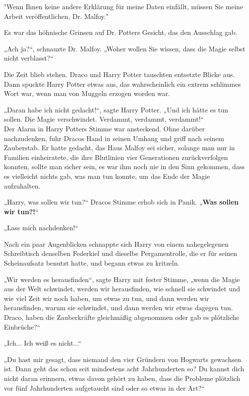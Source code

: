 {"Wenn Ihnen keine andere Erklärung für meine Daten einfällt, müssen Sie meine Arbeit veröffentlichen, Dr. Malfoy."

Es war das höhnische Grinsen auf Dr. Potters Gesicht, das den Ausschlag gab.

„Ach ja?“, schnauzte Dr. Malfoy. „Woher wollen Sie wissen, dass die Magie selbst nicht verblasst?“

Die Zeit blieb stehen. Draco und Harry Potter tauschten entsetzte Blicke aus. Dann spuckte Harry Potter etwas aus, das wahrscheinlich ein extrem schlimmes Wort war, wenn man von Muggeln erzogen worden war.

„Daran habe ich nicht gedacht!“, sagte Harry Potter. „Und ich hätte es tun sollen. Die Magie verschwindet. Verdammt, verdammt, verdammt!“\\ Der Alarm in Harry Potters Stimme war ansteckend. Ohne darüber nachzudenken, fuhr Dracos Hand in seinen Umhang und griff nach seinem Zauberstab. Er hatte gedacht, das Haus Malfoy sei sicher, solange man nur in Familien einheiratete, die ihre Blutlinien vier Generationen zurückverfolgen konnten, sollte man sicher sein, es war ihm noch nie in den Sinn gekommen, dass es vielleicht nichts gab, was man tun konnte, um das Ende der Magie aufzuhalten.

„Harry, was sollen wir tun?“ Dracos Stimme erhob sich in Panik. „\textbf{Was sollen wir tun?!}“

„Lass mich nachdenken!“

Nach ein paar Augenblicken schnappte sich Harry von einem nahegelegenen Schreibtisch denselben Federkiel und dieselbe Pergamentrolle, die er für seinen Scheinaufsatz benutzt hatte, und begann etwas zu kritzeln.

„Wir werden es herausfinden“, sagte Harry mit fester Stimme, „wenn die Magie aus der Welt schwindet, werden wir herausfinden, wie schnell sie schwindet und wie viel Zeit wir noch haben, um etwas zu tun, und dann werden wir herausfinden, warum sie schwindet, und dann werden wir etwas dagegen tun. Draco, haben die Zauberkräfte gleichmäßig abgenommen oder gab es plötzliche Einbrüche?“

„Ich... Ich weiß es nicht...“

„Du hast mir gesagt, dass niemand den vier Gründern von Hogwarts gewachsen ist. Dann geht das schon seit mindestens acht Jahrhunderten so? Du kannst dich nicht daran erinnern, etwas davon gehört zu haben, dass die Probleme plötzlich vor fünf Jahrhunderten aufgetaucht sind oder so etwas in der Art?“

}
